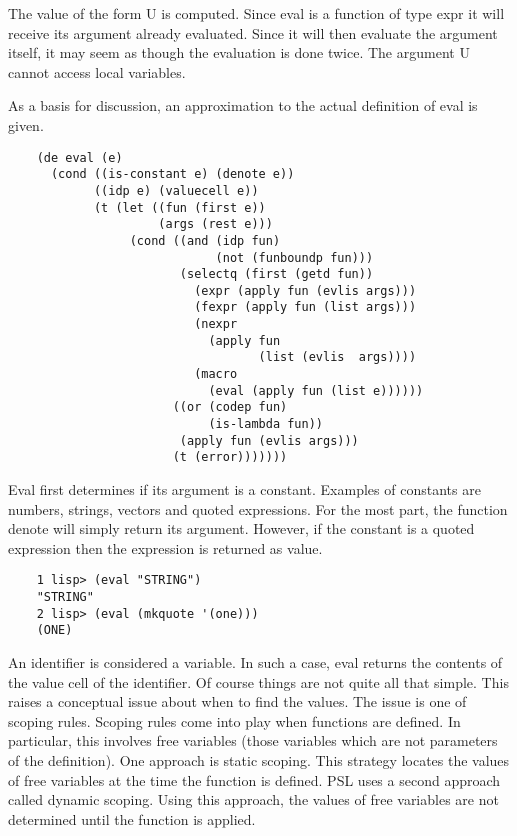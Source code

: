 {    The value of the form U  is  computed.    Since  eval  is  a
    function  of  type expr it will receive its argument already
    evaluated. Since it will then evaluate the argument  itself,
    it  may  seem  as  though the evaluation is done twice.  The
    argument U cannot access local variables.
}
    
As a basis for discussion, an approximation to the actual
definition of eval is given.

\begin{verbatim}
    (de eval (e)
      (cond ((is-constant e) (denote e))
            ((idp e) (valuecell e))
            (t (let ((fun (first e))
                     (args (rest e)))
                 (cond ((and (idp fun)
                             (not (funboundp fun)))
                        (selectq (first (getd fun))
                          (expr (apply fun (evlis args)))
                          (fexpr (apply fun (list args)))
                          (nexpr   
                            (apply fun 
                                   (list (evlis  args))))
                          (macro 
                            (eval (apply fun (list e))))))
                       ((or (codep fun)
                            (is-lambda fun))
                        (apply fun (evlis args)))
                       (t (error)))))))
\end{verbatim}
    Eval  first  determines  if  its  argument  is  a  constant.
    Examples  of  constants  are  numbers,  strings, vectors and
    quoted expressions.  For the most part, the function  denote
    will  simply  return its argument.  However, if the constant
    is a quoted expression then the expression  is  returned  as
    value.

\begin{verbatim}
    1 lisp> (eval "STRING")
    "STRING"
    2 lisp> (eval (mkquote '(one)))
    (ONE)
\end{verbatim}
    An  identifier  is  considered  a variable.  In such a case,
    eval  returns  the  contents  of  the  value  cell  of   the
    identifier.  Of course things are not quite all that simple.
    This  raises  a  conceptual  issue  about  when  to find the
    values.  The issue is one of scoping rules.   Scoping  rules
    come  into  play when functions are defined.  In particular,
    this involves free variables (those variables which are  not
    parameters  of  the  definition).    One  approach is static
    scoping.  This strategy locates the values of free variables
    at the time the function is defined.    PSL  uses  a  second
    approach  called  dynamic scoping.  Using this approach, the
    values of  free  variables  are  not  determined  until  the
    function is applied.

